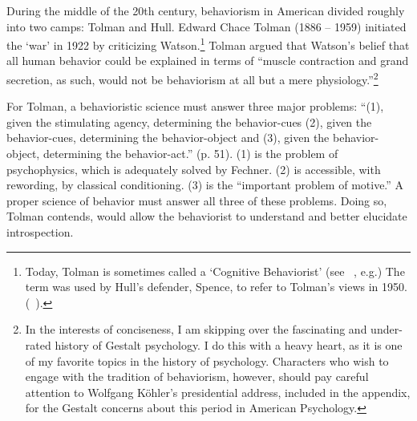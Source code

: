 \begin{refsection}
During the middle of the 20th century, behaviorism in American divided roughly into two camps: Tolman and Hull. Edward Chace Tolman (1886 – 1959) initiated the `war' in 1922 by criticizing Watson.\footnote{Today, Tolman is sometimes called a `Cognitive Behaviorist' (see ~\citep{HOLLAND:2008ci}, e.g.) The term was used by Hull's defender, Spence, to refer to Tolman's views in 1950. (~\citep{Spence:1950fx}).} Tolman argued that Watson's belief that all human behavior could be explained in terms of ``muscle contraction and grand secretion, as such, would not be behaviorism at all but a mere physiology.''\footnote{In the interests of conciseness, I am skipping over the fascinating and under-rated history of Gestalt psychology. I do this with a heavy heart, as it is one of my favorite topics in the history of psychology. Characters who wish to engage with the tradition of behaviorism, however, should pay careful attention to Wolfgang Köhler's presidential address, included in the appendix, for the Gestalt concerns about this period in American Psychology.} ~\citep[p. 45]{Tolman:1922us}

For Tolman, a behavioristic science must answer three major problems: ``(1), given the stimulating agency, determining the behavior-cues (2), given the behavior-cues, determining the behavior-object and (3), given the behavior-object, determining the behavior-act.'' (p. 51). (1) is the problem of psychophysics, which is adequately solved by Fechner. (2) is accessible, with rewording, by classical conditioning. (3) is the ``important problem of motive.'' A proper science of behavior must answer all three of these problems. Doing so, Tolman contends, would allow the behaviorist to understand and better elucidate introspection.


\end{refsection}
